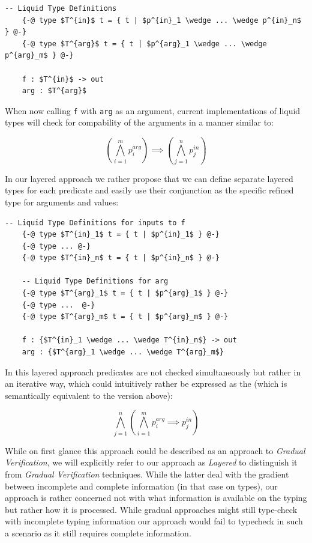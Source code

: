 \documentclass[acmsmall, review, screen]{acmart}
\begin{document}
\begin{lstlisting}[mathescape=true]
	-- Liquid Type Definitions
	{-@ type $T^{in}$ t = { t | $p^{in}_1 \wedge ... \wedge p^{in}_n$  } @-}
	{-@ type $T^{arg}$ t = { t | $p^{arg}_1 \wedge ... \wedge p^{arg}_m$ } @-}

	f : $T^{in}$ -> out 
	arg : $T^{arg}$
\end{lstlisting}


When now calling \texttt{f} with \texttt{arg} as an argument, current implementations of liquid types will check for compability of the arguments in a manner similar to:

$$ \left( \bigwedge^{m}_{i=1} p^{arg}_i \right) \implies \left( \bigwedge^{n}_{j=1} p^{in}_j \right) $$

In our layered approach we rather propose that we can define separate layered types for each predicate and easily use their conjunction as the specific refined type for arguments and values:

\begin{lstlisting}[mathescape=true]
	-- Liquid Type Definitions for inputs to f
	{-@ type $T^{in}_1$ t = { t | $p^{in}_1$ } @-}
	{-@ type ... @-}
	{-@ type $T^{in}_n$ t = { t | $p^{in}_n$ } @-}

	-- Liquid Type Definitions for arg
	{-@ type $T^{arg}_1$ t = { t | $p^{arg}_1$ } @-}
	{-@ type ...  @-}
	{-@ type $T^{arg}_m$ t = { t | $p^{arg}_m$ } @-}

	f : {$T^{in}_1 \wedge ... \wedge T^{in}_n$} -> out 
	arg : {$T^{arg}_1 \wedge ... \wedge T^{arg}_m$}
\end{lstlisting}


In this layered approach predicates are not checked simultaneously but rather in an iterative way, which could intuitively rather be expressed as the (which is semantically equivalent to the version above):

$$ \bigwedge^{n}_{j=1} \left( \bigwedge^{m}_{i=1} p^{arg}_i \implies  p^{in}_j \right) $$

While on first glance this approach could be described as an approach to \textit{Gradual Verification}, we will explicitly refer to our approach as \textit{Layered} to distinguish it from \textit{Gradual Verification} techniques. While the latter deal with the gradient between incomplete and complete information (in that case on types), our approach is rather concerned not with what information is available on the typing but rather how it is processed. While gradual approaches might still type-check with incomplete typing information our approach would fail to typecheck in such a scenario as it still requires complete information. 
\end{document}

